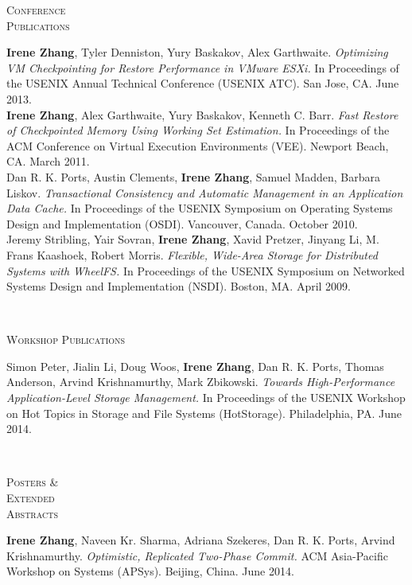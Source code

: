 \documentclass[10pt,times]{report}
\newlength{\sectiongap}
\newlength{\sectioncolwidth}
\newlength{\colgap}
\newlength{\stuffwidth}
\newenvironment{rtable}{
  \begin{minipage}{\textwidth}
  }{
  \end{minipage}
}
\newenvironment{rsection}[1]{
  \begin{minipage}[t]{\sectioncolwidth}
    \textsc{#1}
  \end{minipage}
  \hspace{\colgap}
  \begin{minipage}[t]{\stuffwidth}
  }{
    \removelastskip
  \end{minipage}
  \\[\sectiongap]
}
\begin{document}
\begin{rtable}
\begin{rsection}{Conference\\Publications}
   \textbf{Irene Zhang}, Tyler Denniston, Yury Baskakov, Alex
   Garthwaite.   \textit{Optimizing VM Checkpointing for Restore
     Performance in VMware ESXi.}
   In Proceedings of the USENIX Annual Technical Conference (USENIX ATC).
   San Jose, CA. June 2013.\\

   \textbf{Irene Zhang}, Alex Garthwaite, Yury Baskakov, Kenneth
   C. Barr. \textit{Fast Restore of Checkpointed Memory Using Working
     Set Estimation.}  In Proceedings of the ACM Conference on Virtual
   Execution Environments (VEE). Newport Beach, CA. March 2011.\\

   Dan R. K. Ports, Austin Clements, \textbf{Irene Zhang}, Samuel
   Madden, Barbara Liskov. \textit{Transactional Consistency and
     Automatic Management in an Application Data Cache.}  In
   Proceedings of the USENIX Symposium on Operating Systems Design and
   Implementation (OSDI). Vancouver, Canada. October 2010.\\

   Jeremy Stribling, Yair Sovran, \textbf{Irene Zhang}, Xavid Pretzer,
   Jinyang Li, M. Frans Kaashoek, Robert Morris. \textit{Flexible,
     Wide-Area Storage for Distributed Systems with WheelFS.}  In
   Proceedings of the USENIX Symposium on Networked Systems Design and
   Implementation (NSDI).  Boston, MA. April 2009.  \vspace{1.0em}
  \end{rsection}

  \begin{rsection}{Workshop Publications}
    Simon Peter, Jialin Li, Doug Woos, \textbf{Irene Zhang}, Dan
    R. K. Ports, Thomas Anderson, Arvind Krishnamurthy, Mark
    Zbikowski. \textit{Towards High-Performance Application-Level
      Storage Management.} In Proceedings of the
    USENIX Workshop on Hot Topics in Storage and File Systems (HotStorage). Philadelphia, PA. June 2014. \\
  \end{rsection}

  \begin{rsection}{Posters \&\\Extended\\Abstracts}
    \textbf{Irene Zhang}, Naveen Kr. Sharma, Adriana Szekeres, Dan
    R. K. Ports, Arvind Krishnamurthy. \textit{Optimistic, Replicated
      Two-Phase Commit.}  ACM Asia-Pacific Workshop on Systems (APSys). Beijing, China. June 2014.\\


\end{rsection}
\end{rtable}
\end{document}
